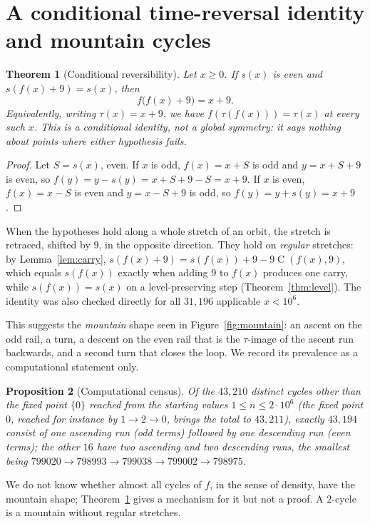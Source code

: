 \documentclass[11pt]{article}
\newtheorem{theorem}{Theorem}[section]
\newtheorem{proposition}[theorem]{Proposition}
\theoremstyle{definition}
\theoremstyle{remark}
\newcommand{\C}{\operatorname{C}}
\begin{document}
\section{A conditional time-reversal identity and mountain cycles}

\begin{theorem}[Conditional reversibility]\label{thm:reverse}
Let $x\ge0$. If $s(x)$ is even and $s(f(x)+9)=s(x)$, then
\[
  f\bigl(f(x)+9\bigr)=x+9 .
\]
Equivalently, writing $\tau(x)=x+9$, we have $f(\tau(f(x)))=\tau(x)$ at every
such $x$. This is a conditional identity, not a global symmetry: it says
nothing about points where either hypothesis fails.
\end{theorem}

\begin{proof}
Let $S=s(x)$, even. If $x$ is odd, $f(x)=x+S$ is odd and $y=x+S+9$ is even,
so $f(y)=y-s(y)=x+S+9-S=x+9$. If $x$ is even, $f(x)=x-S$ is even and
$y=x-S+9$ is odd, so $f(y)=y+s(y)=x+9$.
\end{proof}

When the hypotheses hold along a whole stretch of an orbit, the stretch is
retraced, shifted by $9$, in the opposite direction. They hold on
\emph{regular} stretches: by Lemma~\ref{lem:carry},
$s(f(x)+9)=s(f(x))+9-9\C(f(x),9)$, which equals $s(f(x))$ exactly when adding
$9$ to $f(x)$ produces one carry, while $s(f(x))=s(x)$ on a level-preserving
step (Theorem~\ref{thm:level}). The identity was also checked directly for all
$31{,}196$ applicable $x<10^6$.

This suggests the \emph{mountain} shape seen in Figure~\ref{fig:mountain}: an
ascent on the odd rail, a turn, a descent on the even rail that is the
$\tau$-image of the ascent run backwards, and a second turn that closes the
loop. We record its prevalence as a computational statement only.

\begin{proposition}[Computational census]\label{prop:census}
Of the $43{,}210$ distinct cycles other than the fixed point $\{0\}$ reached
from the starting values $1\le n\le2\cdot10^6$ (the fixed point $0$, reached
for instance by $1\to2\to0$, brings the total to $43{,}211$), exactly $43{,}194$ consist of one ascending run (odd
terms) followed by one descending run (even terms); the other $16$ have two
ascending and two descending runs, the smallest being
$799020\to798993\to799038\to799002\to798975$.
\end{proposition}

We do not know whether almost all cycles of $f$, in the sense of density, have
the mountain shape; Theorem~\ref{thm:reverse} gives a mechanism for it but not
a proof. A $2$-cycle is a mountain without regular stretches.
\end{document}
